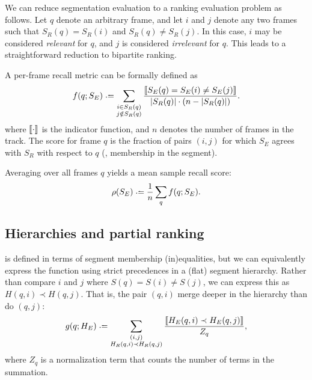 \documentclass{article}
\begin{document}
We can reduce segmentation evaluation to a ranking evaluation problem as follows.
Let $q$ denote an arbitrary frame, and let $i$ and $j$ denote any two frames such that $S_R(q) = S_R(i)$ and $S_R(q) \neq S_R(j)$.
In this case, $i$ may be considered \emph{relevant} for $q$, and $j$ is considered \emph{irrelevant} for $q$.
This leads to a straightforward reduction to bipartite ranking.

A per-frame recall metric can be formally defined as
\begin{equation}
f(q ; S_E) \defeq 
\sum_{\substack{i \in S_R(q)\\ j \notin S_R(q)}}
\frac{\ind{S_E(q) = S_E(i) \neq S_E(j) }}{|S_R(q)|\cdot (n -
|S_R(q)|)}.\label{flatrecall}
\end{equation}
where $\left\llbracket\cdot\right\rrbracket$ is the indicator function, and $n$ denotes the number of frames in the track.
The score for frame $q$ is the fraction of pairs $(i, j)$ for which $S_E$
agrees with $S_R$ with respect to $q$ (\ie, membership in the segment).

Averaging over all frames $q$ yields a mean sample recall score:
\begin{equation}
\rho(S_E) \defeq \frac{1}{n} \sum_q f(q ; S_E).\label{avgrecall}
\end{equation}
\nocite{levy2008structural}


\subsection{Hierarchies and partial ranking}

 is defined in terms of segment membership (in)equalities, but we can equivalently express the function using strict precedences in a (flat) segment hierarchy.
Rather than compare $i$ and $j$ where $S(q) = S(i) \neq S(j)$, we can express this as $H(q, i) \prec H(q, j)$.
That is, the pair $(q,i)$ merge deeper in the hierarchy than do $(q,j)$:
\begin{equation}
g(q ; H_E) \defeq \sum_{\substack{(i, j)\\ H_R(q, i) \prec H_R(q, j)}}
\frac{\ind{H_E(q, i) \prec H_E(q, j)}}{Z_q},\label{hierrecall}
\end{equation}
where $Z_q$ is a normalization term that counts the number of terms in the summation.
\end{document}
